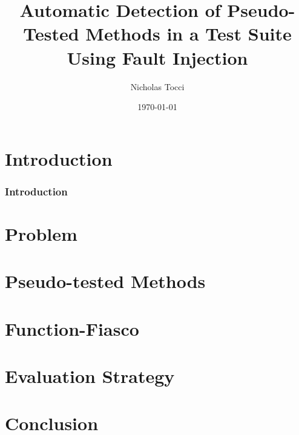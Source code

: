 \documentclass{beamer}
\title{Automatic Detection of Pseudo-Tested Methods in a Test Suite Using Fault Injection}
\author{Nicholas Tocci}
\date{\today}
\begin{document}
\section{Introduction}
\begin{frame}
	\frametitle{Introduction}
	\titlepage
\end{frame}
\section{Problem}
\label{sec:problem}


\section{Pseudo-tested Methods}
\label{sec:pseudo-tested methods}


\section{Function-Fiasco}
\label{sec:function-fiasco}


\section{Evaluation Strategy}
\label{sec:Evaluation Strategy}


\section{Conclusion}
\label{sec:Conclusion}

\end{document}
